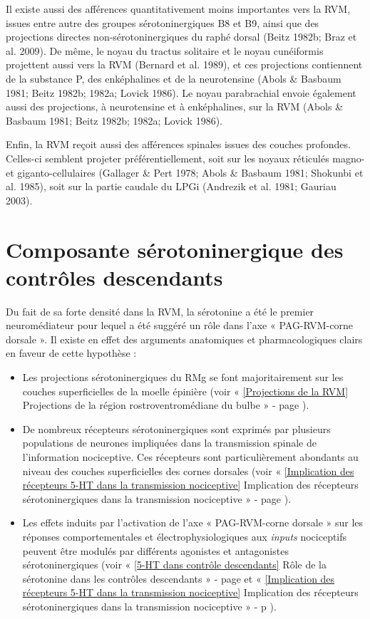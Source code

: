 \documentclass[a4paper,12pt,twoside]{report}
\begin{document}
Il existe aussi des afférences quantitativement moins importantes vers la RVM, issues entre autre des groupes sérotoninergiques B8 et B9, ainsi que des projections directes non-sérotoninergiques du raphé dorsal (Beitz 1982b; Braz et al. 2009). De même, le noyau du tractus solitaire et le noyau cunéiformis projettent aussi vers la RVM (Bernard et al. 1989), et ces projections contiennent de la substance P, des enképhalines et de la neurotensine (Abols \& Basbaum 1981; Beitz 1982b; 1982a; Lovick 1986). Le noyau parabrachial envoie également aussi des projections, à neurotensine et à enképhalines, sur la RVM (Abols \& Basbaum 1981; Beitz 1982b; 1982a; Lovick 1986).

Enfin, la RVM reçoit aussi des afférences spinales issues des couches profondes. Celles-ci semblent projeter préférentiellement, soit sur les noyaux réticulés magno- et giganto-cellulaires (Gallager \& Pert 1978; Abols \& Basbaum 1981; Shokunbi et al. 1985), soit sur la partie caudale du LPGi (Andrezik et al. 1981; Gauriau 2003).

\section{Composante sérotoninergique des contrôles descendants}

Du fait de sa forte densité dans la RVM, la sérotonine a été le premier neuromédiateur pour lequel a été suggéré un rôle dans l’axe « PAG-RVM-corne dorsale ». Il existe en effet des arguments anatomiques et pharmacologiques clairs en faveur de cette hypothèse :

\begin{itemize}
\item Les projections sérotoninergiques du RMg se font majoritairement sur les couches superficielles de la moelle épinière (voir « \ref{Projections de la RVM} Projections de la région rostroventromédiane du bulbe » - page \pageref{Projections de la RVM}).
\item De nombreux récepteurs sérotoninergiques sont exprimés par plusieurs populations de neurones impliquées dans la transmission spinale de l’information nociceptive. Ces récepteurs sont particulièrement abondants au niveau des couches superficielles des cornes dorsales (voir « \ref{Implication des récepteurs 5-HT dans la transmission nociceptive} Implication des récepteurs sérotoninergiques dans la transmission nociceptive » - page \pageref{Implication des récepteurs 5-HT dans la transmission nociceptive}).
\item Les effets induits par l’activation de l’axe « PAG-RVM-corne dorsale » sur les réponses comportementales et électrophysiologiques aux \textit{inputs} nociceptifs peuvent être modulés par différents agonistes et antagonistes sérotoninergiques (voir « \ref{5-HT dans contrôle descendants} Rôle de la sérotonine dans les contrôles descendants » - page \pageref{5-HT dans contrôle descendants} et « \ref{Implication des récepteurs 5-HT dans la transmission nociceptive} Implication des récepteurs sérotoninergiques dans la transmission nociceptive » - p \pageref{Implication des récepteurs 5-HT dans la transmission nociceptive}).
\end{itemize}
\end{document}
